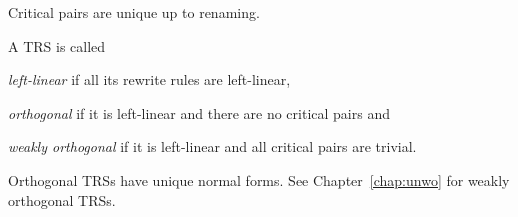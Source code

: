 Critical pairs are unique up to renaming.



\begin{definition}%
A TRS is called
\begin{compactenum}
  \item \emph{left-linear} if all its rewrite rules are left-linear,
  \item \emph{orthogonal} if it is left-linear and there are no critical pairs and
  \item \emph{weakly orthogonal} if it is left-linear and all critical pairs
    are trivial.
\end{compactenum}
\end{definition}

Orthogonal TRSs have unique normal forms. See Chapter~\ref{chap:unwo} for
weakly orthogonal TRSs.
